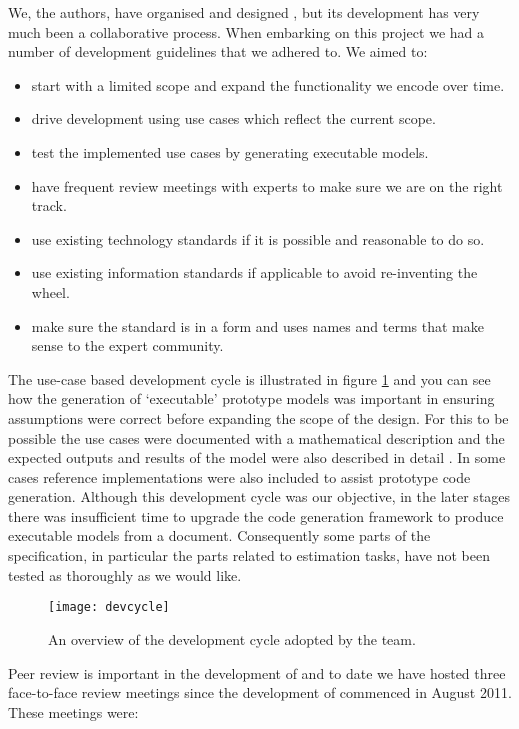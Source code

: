 We, the authors, have organised and designed \pharmml, but its development has very much been a
collaborative process. When embarking on this project we had a number of development guidelines that we adhered to.
We aimed to:

\begin{itemize}
\item start with a limited scope and expand the functionality we encode over time.
\item drive development using use cases which reflect the current scope.
\item test the implemented use cases by generating executable models.
\item have frequent review meetings with experts to make sure we are on the right track.
\item use existing technology standards if it is possible and reasonable to do so.
\item use existing information standards if applicable to avoid re-inventing the wheel.
\item make sure the standard is in a form and uses names and terms that make sense to the expert community.
\end{itemize}

The use-case based development cycle is illustrated in figure \ref{fig:devcycle} and you can see
how the generation of `executable' prototype models was important in ensuring assumptions were
correct before expanding the scope of the design. For this to be possible the use cases were
documented with a mathematical description and the expected outputs and results of the model were
also described in detail \cite{Swat:2013aa}. In some cases reference \matlab\xspace implementations were also included to
assist prototype code generation. Although this development cycle was our objective, in the later
stages there was insufficient time to upgrade the code generation framework to produce executable models
from a \pharmml document. Consequently some parts of the specification, in particular the parts related
to estimation tasks, have not been tested as thoroughly as we would like.

\begin{figure}[htb]
\centering%
 \texttt{[image: devcycle]}
\caption{An overview of the development cycle adopted by the \pharmml team.}
\label{fig:devcycle}
\end{figure}


Peer review is important in the development of \pharmml and to date we have hosted three face-to-face
review meetings since the development of \pharmml commenced in August 2011. These meetings were:

